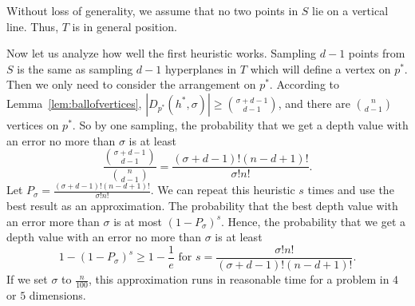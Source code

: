 \documentclass{patmorin}
\begin{document}
Without loss of generality, we assume that no two points in $S$ lie on a vertical line. Thus, $T$ is in general position.

Now let us analyze how well the first heuristic works. Sampling $d - 1$ points from $S$ is the same as sampling $d - 1$ hyperplanes in $T$ which will define a vertex on $p^{*}$. Then we only need to consider the arrangement on $p^{*}$. According to Lemma~\ref{lem:ballofvertices}, $|D_{p^{*}}(h^{*},\sigma)| \geq \binom{\sigma+d-1}{d-1}$, and there are $\binom{n}{d-1}$ vertices on $p^{*}$. So by one sampling, the probability that we get a depth value with an error no more than $\sigma$ is at least
\begin{equation}
  \label{eq:prbvertex}
  \frac{\binom{\sigma+d-1}{d-1}}{\binom{n}{d-1}} = \frac{(\sigma+d-1)!(n-d+1)!}{\sigma!n!} .%
\end{equation}
Let $P_{\sigma} = \frac{(\sigma+d-1)!(n-d+1)!}{\sigma!n!}$. We can repeat this heuristic $s$ times and use the best result as an approximation. The probability that the best depth value with an error more than $\sigma$ is at most $(1 - P_{\sigma})^{s}$. Hence, the probability that we get a depth value with an error no more than $\sigma$ is at least
\begin{equation}
  \label{eq:prbappr}
  1 - (1 - P_{\sigma})^{s} \geq 1 - \frac{1}{e} \textrm{ for } s = \frac{\sigma!n!}{(\sigma+d-1)!(n-d+1)!} .%
\end{equation}
If we set $\sigma$ to $\frac{n}{100}$, this approximation runs in reasonable time for a problem in $4$ or $5$ dimensions.
\end{document}
